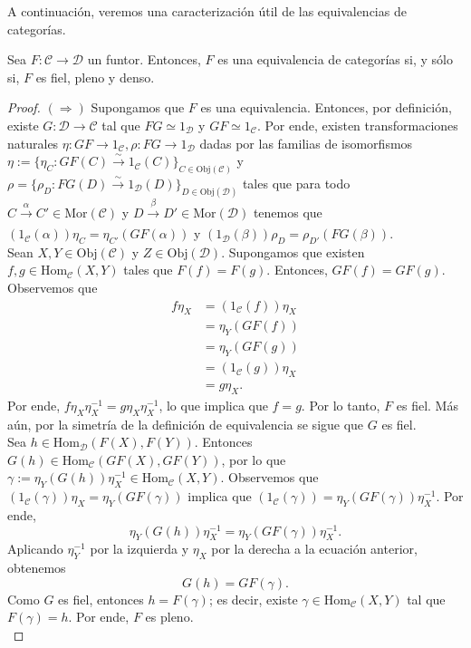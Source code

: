 \documentclass[tesis]{subfiles}
\begin{document}
A continuación, veremos una caracterización útil de las equivalencias de categorías.

\begin{Prop}\label{Mendoza-Ejer.5}
    Sea $F: \mathscr{C}\to \mathscr{D}$ un funtor. Entonces, $F$ es una equivalencia de categorías si, y sólo si, $F$ es fiel, pleno y denso.
\end{Prop}

\begin{proof}
    $(\Rightarrow)$ Supongamos que $F$ es una equivalencia. Entonces, por definición, existe $G:\mathscr{D}\to \mathscr{C}$ tal que $FG\simeq1_\mathscr{D}$ y $GF\simeq1_\mathscr{C}$. Por ende, existen transformaciones naturales $\eta:GF\to 1_\mathscr{C}, \rho:FG\to 1_\mathscr{D}$ dadas por las familias de isomorfismos $\eta:=\{\eta_C:GF(C)\xrightarrow[]{\sim}1_\mathscr{C}(C)\}_{C\in\text{Obj}(\mathscr{C})}$ y $\rho=\{\rho_D:FG(D)\xrightarrow[]{\sim}1_\mathscr{D}(D)\}_{D\in\text{Obj}(\mathscr{D})}$ tales que para todo $C\xrightarrow[]{\alpha} C'\in\text{Mor}(\mathscr{C})$ y $D\xrightarrow[]{\beta} D'\in\text{Mor}(\mathscr{D})$ tenemos que $(1_\mathscr{C}(\alpha))\eta_C = \eta_{C'}(GF(\alpha))$ y $(1_\mathscr{D}(\beta))\rho_D = \rho_{D'}(FG(\beta))$. \\

    Sean $X,Y\in\text{Obj}(\mathscr{C})$ y $Z\in\text{Obj}(\mathscr{D})$. Supongamos que existen $f,g\in\text{Hom}_\mathscr{C}(X,Y)$ tales que $F(f)=F(g)$. Entonces, $GF(f)=GF(g)$. Observemos que
    \begin{align*}
        f\eta_X &= (1_\mathscr{C}(f))\eta_X \\
                &= \eta_Y(GF(f)) \\
                &= \eta_Y(GF(g)) \\
                &= (1_\mathscr{C}(g))\eta_X \\
                &= g\eta_X.
    \end{align*}
    Por ende, $f\eta_X\eta_X^{-1} = g\eta_X\eta_X^{-1}$, lo que implica que $f=g$. Por lo tanto, $F$ es fiel. Más aún, por la simetría de la definición de equivalencia se sigue que $G$ es fiel. \\

    Sea $h\in\text{Hom}_\mathscr{D}(F(X),F(Y))$. Entonces $G(h)\in\text{Hom}_\mathscr{C}(GF(X),GF(Y))$, por lo que $\gamma := \eta_Y (G(h))\eta_X^{-1}\in\text{Hom}_\mathscr{C}(X,Y)$. Observemos que $(1_\mathscr{C}(\gamma))\eta_X = \eta_Y(GF(\gamma))$ implica que $(1_\mathscr{C}(\gamma)) = \eta_Y(GF(\gamma))\eta_X^{-1}$. Por ende,
    \[
        \eta_Y(G(h))\eta_X^{-1} = \eta_Y(GF(\gamma))\eta_X^{-1}. 
    \] 
    Aplicando $\eta_Y^{-1}$ por la izquierda y $\eta_X$ por la derecha a la ecuación anterior, obtenemos
    \[
        G(h) = GF(\gamma).
    \] 
    Como $G$ es fiel, entonces $h=F(\gamma)$; es decir, existe $\gamma\in\text{Hom}_\mathscr{C}(X,Y)$ tal que $F(\gamma)=h$. Por ende, $F$ es pleno. \\


\end{proof}
\end{document}
